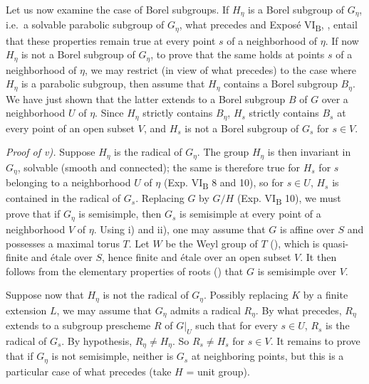 Let us now examine the case of Borel subgroups. If \(H_{\eta}\) is a Borel subgroup of \(G_{\eta}\), i.e.~a solvable
parabolic subgroup of \(G_{\eta}\), what precedes and Exposé VI\textsubscript{B}, , entail that these properties remain true at every
point \(s\) of a neighborhood of \(\eta\). If now \(H_{\eta}\) is not a Borel subgroup of \(G_{\eta}\), to prove that the same
holds at points \(s\) of a neighborhood of \(\eta\), we may restrict (in view of what precedes) to the case where \(H_{\eta}\)
is a parabolic subgroup, then assume that \(H_{\eta}\) contains a Borel subgroup \(B_{\eta}\). We have just shown that the
latter extends to a Borel subgroup \(B\) of \(G\) over a neighborhood \(U\) of \(\eta\). Since \(H_{\eta}\) strictly contains
\(B_{\eta}\), \(H_{s}\) strictly contains \(B_{s}\) at every point of an open subset \(V\), and \(H_{s}\) is not a Borel subgroup
of \(G_{s}\) for \(s \in V\).

\emph{Proof of v).} Suppose \(H_{\eta}\) is the radical of \(G_{\eta}\). The group \(H_{\eta}\) is then invariant in \(G_{\eta}\),
solvable (smooth and connected); the same is therefore true for \(H_{s}\) for \(s\) belonging to a neighborhood \(U\) of
\(\eta\) (Exp. VI\textsubscript{B} 8 and 10), so for \(s \in U\), \(H_{s}\) is contained in the radical of \(G_{s}\). Replacing \(G\) by \(G/H\)
(Exp. VI\textsubscript{B} 10), we must
prove that if \(G_{\eta}\) is semisimple, then \(G_{s}\) is semisimple at every point of a neighborhood \(V\) of \(\eta\). Using
i) and ii), one may assume that \(G\) is affine over \(S\) and possesses a maximal torus \(T\). Let \(W\) be the Weyl group of
\(T\) (), which is quasi-finite and étale over \(S\), hence finite and étale over an open subset \(V\). It then
follows from the elementary properties of roots () that \(G\) is semisimple over \(V\).

Suppose now that \(H_{\eta}\) is not the radical of \(G_{\eta}\). Possibly replacing \(K\) by a finite extension \(L\), we may
assume that \(G_{\eta}\) admits a radical \(R_{\eta}\). By what precedes, \(R_{\eta}\) extends to a subgroup prescheme \(R\) of
\(G|_{U}\) such that for every \(s \in U\), \(R_{s}\) is the radical of \(G_{s}\). By hypothesis, \(R_{\eta} \neq H_{\eta}\). So
\(R_{s} \neq H_{s}\) for \(s \in V\). It remains to prove that if \(G_{\eta}\) is not semisimple, neither is \(G_{s}\) at
neighboring points, but this is a particular case of what precedes (take \(H\) = unit group).

